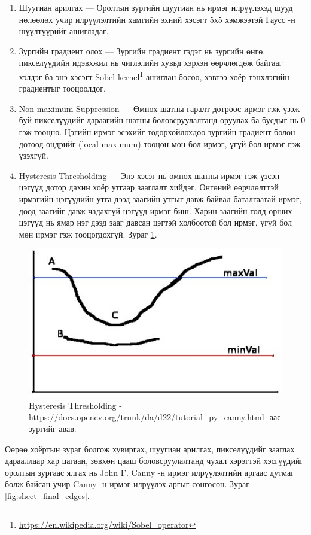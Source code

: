 \begin{enumerate}
	\item Шуугиан арилгах --- Оролтын зургийн шуугиан нь ирмэг илрүүлэхэд шууд нөлөөлөх учир илрүүлэлтийн хамгийн эхний хэсэгт 5х5 хэмжээтэй Гаусс -н шүүлтүүрийг ашигладаг.
	\item Зургийн градиент олох --- Зургийн градиент гэдэг нь зургийн өнгө, пикселүүдийн идэвхжил нь чиглэлийн хувьд хэрхэн өөрчлөгдөж байгааг хэлдэг ба энэ хэсэгт Sobel kernel\footnote{\url{https://en.wikipedia.org/wiki/Sobel_operator}} ашиглан босоо, хэвтээ хоёр тэнхлэгийн градиентыг тооцоолдог.
	\item Non-maximum Suppression --- Өмнөх шатны гаралт дотроос ирмэг гэж үзэж буй пикселүүдийг дараагийн шатны боловсруулалтанд оруулах ба бусдыг нь 0 гэж тооцно. Цэгийн ирмэг эсэхийг тодорхойлохдоо зургийн градиент болон дотоод өндрийг (local maximum) тооцон мөн бол ирмэг, үгүй бол ирмэг гэж үзэхгүй.
	\item Hysteresis Thresholding --- Энэ хэсэг нь өмнөх шатны ирмэг гэж үзсэн цэгүүд дотор дахин хоёр утгаар зааглалт хийдэг. Өнгөний өөрчлөлттэй ирмэгийн цэгүүдийн утга дээд заагийн утгыг давж байвал баталгаатай ирмэг, доод заагийг давж чадахгүй цэгүүд ирмэг биш. Харин заагийн голд орших цэгүүд нь ямар нэг дээд зааг давсан цэгтэй холбоотой бол ирмэг, үгүй бол мөн ирмэг гэж тооцогдохгүй. Зураг \ref{fig:hysteresis}.
\end{enumerate}

\begin{figure}[ht]
	\centering
	\includegraphics[width=0.6\linewidth]{images/hysteresis}
	\caption{Hysteresis Thresholding - \url{https://docs.opencv.org/trunk/da/d22/tutorial_py_canny.html} -аас зургийг авав.}
	\label{fig:hysteresis}
\end{figure}

Өөрөө хоёртын зураг болгож хувиргах, шуугиан арилгах, пикселүүдийг зааглах дарааллаар хар цагаан, зөвхөн цааш боловсруулалтанд чухал хэрэгтэй хэсгүүдийг оролтын зургаас ялгах нь John F. Canny -н ирмэг илрүүлэлтийн аргаас дутмаг болж байсан учир Canny -н ирмэг илрүүлэх аргыг сонгосон. Зураг \ref{fig:sheet_final_edges}.

